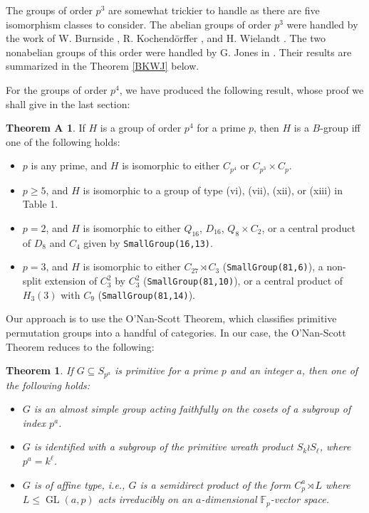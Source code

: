 \documentclass[12pt]{amsart}
\newtheorem{theorem}{Theorem}[section]
\theoremstyle{definition}
\newtheorem*{thmA}{Theorem A}
\newcommand{\F}{\mathbb{F}}
\DeclareMathOperator{\GL}{GL}
\begin{document}
	The groups of order $p^3$ are somewhat trickier to handle as there are five isomorphism classes to consider. The abelian groups of order $p^3$ were handled by the work of W. Burnside \cite{Burn}, R. Kochend\"orffer \cite{Koch}, and H. Wielandt \cite{W}. The two nonabelian groups of this order were handled by G. Jones in \cite{Jones}. Their results are summarized in the Theorem \ref{BKWJ} below.
	
	For the groups of order $p^4$, we have produced the following result, whose proof we shall give in the last section:
	\begin{thmA}
		If $H$ is a group of order $p^4$ for a prime $p$, then $H$ is a $B$-group iff one of the following holds:
		\begin{itemize}
			\item[(i)] $p$ is any prime, and $H$ is isomorphic to either $C_{p^4}$ or $C_{p^3} \times C_p$.
			\item[(ii)] $p \geq 5$, and $H$ is isomorphic to a group of type (vi), (vii), (xii), or (xiii) in Table 1.
			\item[(iii)] $p = 2$, and $H$ is isomorphic to either $Q_{16}$, $D_{16}$, $Q_8 \times C_2$, or a central product of $D_8$ and $C_4$ given by \texttt{SmallGroup(16,13)}.
			\item[(iv)] $p = 3$, and $H$ is isomorphic to either $C_{27} \rtimes C_3$ (\texttt{SmallGroup(81,6)}), a non-split extension of $C_3^2$ by $C_3^2$ (\texttt{SmallGroup(81,10)}), or a central product of $H_3(3)$ with $C_9$ (\texttt{SmallGroup(81,14)}).
		\end{itemize}  
	\end{thmA}
	
	Our approach is to use the O'Nan-Scott Theorem, which classifies primitive permutation groups into a handful of categories. In our case, the O'Nan-Scott Theorem reduces to the following:
	\begin{theorem}
		If $G \subseteq S_{p^a}$ is primitive for a prime $p$ and an integer $a$, then one of the following holds:
		\begin{itemize}
			\item[(i)] $G$ is an almost simple group acting faithfully on the cosets of a subgroup of index $p^a$. 
			\item[(ii)] $G$ is identified with a subgroup of the primitive wreath product $S_k \wr S_\ell$, where $p^a = k^\ell$.
			\item[(iii)] $G$ is of affine type, i.e., $G$ is a semidirect product of the form $C_p^a \rtimes L$ where $L \leq \GL(a,p)$ acts irreducibly on an $a$-dimensional $\F_p$-vector space.
		\end{itemize}
	\end{theorem}
	
\end{document}
